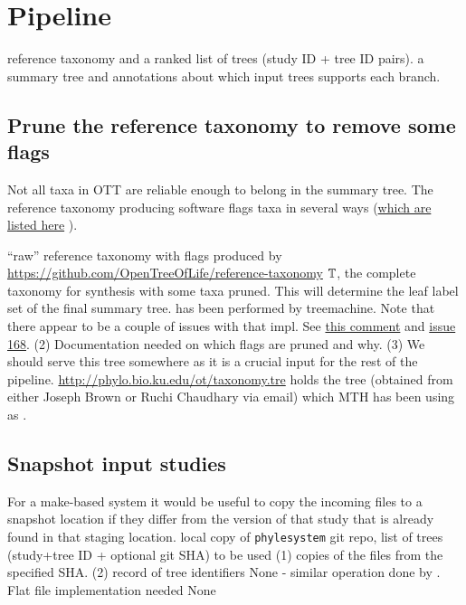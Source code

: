 \documentclass[11pt]{article}
\begin{document}
\section{Pipeline}
\stepInput reference taxonomy and a ranked list of trees (study ID + tree ID pairs).
\stepOutput a summary tree and annotations about which input trees supports each branch.


\subsection{Prune the reference taxonomy to remove some flags}
\stepExplanation Not all taxa in OTT are reliable enough to belong in the 
    summary tree.
The reference taxonomy producing software flags taxa in several ways 
(\href{https://github.com/OpenTreeOfLife/reference-taxonomy/wiki/taxon-flags}{which are listed here}
).

\stepInput ``raw'' reference taxonomy with flags produced by \url{https://github.com/OpenTreeOfLife/reference-taxonomy}
\stepOutput $\mathbb{T}$, the complete taxonomy for synthesis with some taxa pruned.
This will determine the leaf label set of the final summary tree.
\currImpl has been performed by treemachine. Note that there appear to be
    a couple of issues with that impl. See 
\href{https://github.com/OpenTreeOfLife/treemachine/commit/48211803f137ad0b7c096c28d1c10d32f671194f}{this comment} and
\href{https://github.com/OpenTreeOfLife/treemachine/issues/168}{issue 168}.
(2) Documentation needed on which flags are pruned and why.
(3) We should serve this tree somewhere as it is a crucial input for the rest of the pipeline.
\currURL {} \url{http://phylo.bio.ku.edu/ot/taxonomy.tre} holds the tree (obtained
    from either Joseph Brown or Ruchi Chaudhary via email) which MTH has been using as \taxonomy.

\subsection{Snapshot input studies}
\stepExplanation For a make-based system it would be useful to copy the incoming \nexson files
    to a snapshot location if they differ from the version of that study that is already found
    in that staging location.
\stepInput local copy of \texttt{phylesystem} git repo, list of trees (study+tree ID + optional git SHA) to be used
\stepOutput (1) copies of the \nexson files from the specified SHA. (2) record of tree identifiers
\currImpl None - similar operation done by \gcmdr.
\implTODO Flat file implementation needed
\currURL None
 
\end{document}

